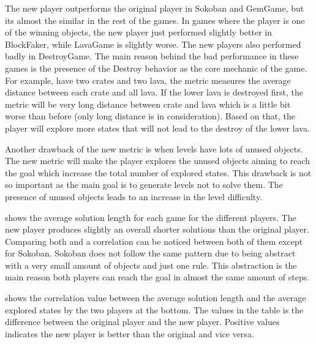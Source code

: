 The new player outperforms the original player in Sokoban and GemGame, but its almost the similar in the rest of the games. In games where the player is one of the winning objects, the new player just performed slightly better in BlockFaker, while LavaGame is slightly worse. The new players also performed badly in DestroyGame. The main reason behind the bad performance in these games is the presence of the Destroy behavior as the core mechanic of the game. For example,  have two crates and two lava, the metric measures the average distance between each crate and all lava. If the lower lava is destroyed first, the metric will be very long distance between crate and lava which is a little bit worse than before (only long distance is in consideration). Based on that, the player will explore more states that will not lead to the destroy of the lower lava.


Another drawback of the new metric is when levels have lots of unused objects. The new metric will make the player explores the unused objects aiming to reach the goal which increase the total number of explored states. This drawback is not so important as the main goal is to generate levels not to solve them. The presence of unused objects leads to an increase in the level difficulty.\\\par

 shows the average solution length for each game for the different players. The new player produces slightly an overall shorter solutions than the original player. Comparing both  and  a correlation can be noticed between both of them except for Sokoban. Sokoban does not follow the same pattern due to being abstract with a very small amount of objects and just one rule. This abstraction is the main reason both players can reach the goal in almost the same amount of steps.


 shows the correlation value between the average solution length and the average explored states by the two players at the bottom. The values in the table is the difference between the original player and the new player. Positive values indicates the new player is better than the original and vice versa.

